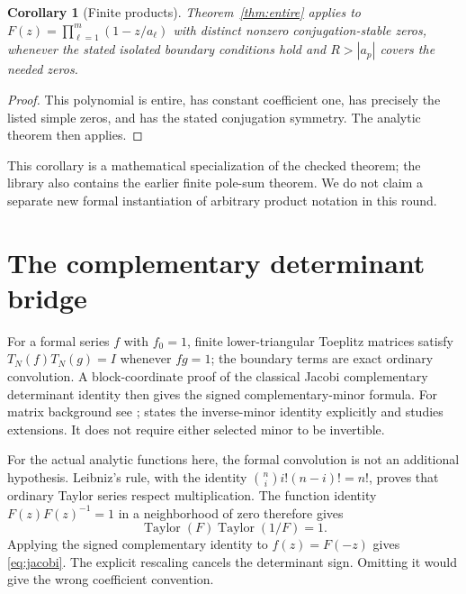 \documentclass[11pt]{amsart}
\newtheorem{corollary}[theorem]{Corollary}
\begin{document}
\begin{corollary}[Finite products]
Theorem~\ref{thm:entire} applies to
$F(z)=\prod_{\ell=1}^m(1-z/a_\ell)$ with distinct nonzero conjugation-stable zeros, whenever the stated isolated boundary conditions hold and $R>|a_p|$ covers the needed zeros.
\end{corollary}
\begin{proof}
This polynomial is entire, has constant coefficient one, has precisely the listed simple zeros, and has the stated conjugation symmetry. The analytic theorem then applies.
\end{proof}
This corollary is a mathematical specialization of the checked theorem; the library also contains the earlier finite pole-sum theorem. We do not claim a separate new formal instantiation of arbitrary product notation in this round.

\section{The complementary determinant bridge}
For a formal series $f$ with $f_0=1$, finite lower-triangular Toeplitz matrices satisfy
$T_N(f)T_N(g)=I$ whenever $fg=1$; the boundary terms are exact ordinary convolution.
A block-coordinate proof of the classical Jacobi complementary determinant identity then gives the signed complementary-minor formula. For matrix background see \cite{hornjohnson}; \cite{bapat} states the inverse-minor identity explicitly and studies extensions. It does not require either selected minor to be invertible.

For the actual analytic functions here, the formal convolution is not an additional hypothesis. Leibniz's rule, with the identity
$\binom ni i!(n-i)!=n!$, proves that ordinary Taylor series respect multiplication. The function identity $F(z)F(z)^{-1}=1$ in a neighborhood of zero therefore gives
\[
 \operatorname{Taylor}(F)\operatorname{Taylor}(1/F)=1.
\]
Applying the signed complementary identity to $f(z)=F(-z)$ gives \eqref{eq:jacobi}. The explicit rescaling cancels the determinant sign. Omitting it would give the wrong coefficient convention.
\end{document}
